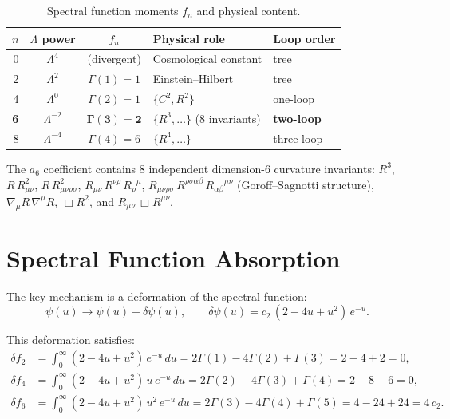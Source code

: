\documentclass[12pt,a4paper]{article}
\begin{document}
\begin{table}[H]
\centering
\caption{Spectral function moments $f_n$ and physical content.}
\label{tab:moments}
\begin{tabular}{rccll}
\toprule
$n$ & $\Lambda$ power & $f_n$ & Physical role & Loop order \\
\midrule
0 & $\Lambda^4$      & (divergent)  & Cosmological constant  & tree \\
2 & $\Lambda^2$      & $\Gamma(1)=1$& Einstein--Hilbert      & tree \\
4 & $\Lambda^0$      & $\Gamma(2)=1$& $\{C^2, R^2\}$        & one-loop \\
\textbf{6} & $\Lambda^{-2}$ & $\boldsymbol{\Gamma(3)=2}$
  & $\{R^3, \dots\}$ (8 invariants)  & \textbf{two-loop} \\
8 & $\Lambda^{-4}$   & $\Gamma(4)=6$& $\{R^4, \dots\}$      & three-loop \\
\bottomrule
\end{tabular}
\end{table}

\noindent The $a_6$ coefficient contains 8 independent dimension-6
curvature invariants:
$R^3$,
$R\,R_{\mu\nu}^2$,
$R\,R_{\mu\nu\rho\sigma}^2$,
$R_{\mu\nu}\,R^{\nu\rho}\,R_\rho{}^\mu$,
$R_{\mu\nu\rho\sigma}\,R^{\rho\sigma\alpha\beta}\,R_{\alpha\beta}{}^{\mu\nu}$
(Goroff--Sagnotti structure),
$\nabla_\mu R\,\nabla^\mu R$,
$\Box R^2$, and
$R_{\mu\nu}\,\Box R^{\mu\nu}$.

\section{Spectral Function Absorption}
\label{sec:absorption}

The key mechanism is a deformation of the spectral function:
\begin{equation}
  \psi(u) \to \psi(u) + \delta\psi(u),
  \qquad
  \delta\psi(u) = c_2\,(2 - 4u + u^2)\,e^{-u}.
  \label{eq:deformation}
\end{equation}

\noindent This deformation satisfies:
\begin{align}
  \delta f_2 &= \int_0^\infty (2 - 4u + u^2)\,e^{-u}\,du
    = 2\Gamma(1) - 4\Gamma(2) + \Gamma(3) = 2 - 4 + 2 = 0, \\
  \delta f_4 &= \int_0^\infty (2 - 4u + u^2)\,u\,e^{-u}\,du
    = 2\Gamma(2) - 4\Gamma(3) + \Gamma(4) = 2 - 8 + 6 = 0, \\
  \delta f_6 &= \int_0^\infty (2 - 4u + u^2)\,u^2\,e^{-u}\,du
    = 2\Gamma(3) - 4\Gamma(4) + \Gamma(5) = 4 - 24 + 24 = 4\,c_2.
\end{align}
\end{document}
